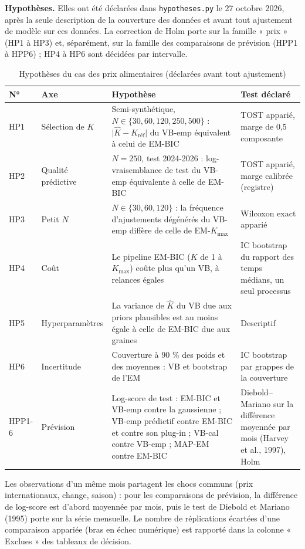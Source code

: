 \textbf{Hypothèses. }Elles ont été déclarées dans \texttt{hypotheses.py} le 27 octobre 2026, après la seule description de la couverture des données et avant tout ajustement de modèle sur ces données. La correction de Holm porte sur la famille « prix » (HP1 à HP3) et, séparément, sur la famille des comparaisons de prévision (HPP1 à HPP6) ; HP4 à HP6 sont décidées par intervalle.

\begin{table}[H]
\centering
\small
\setlength{\tabcolsep}{0.1cm}
\begin{tabular}{|p{1.3cm}|p{2.4cm}|p{5.6cm}|p{5.2cm}|}
\hline
\textbf{N°} & \textbf{Axe} & \textbf{Hypothèse} & \textbf{Test déclaré} \\
\hline
HP1 & Sélection de $K$ & Semi-synthétique, $N \in \{30, 60, 120, 250, 500\}$ : $\lvert\hat K - K_{\text{réf}}\rvert$ du VB-emp équivalent à celui de EM-BIC & TOST apparié, marge de 0,5 composante \\
\hline
HP2 & Qualité prédictive & $N = 250$, test 2024-2026 : log-vraisemblance de test du VB-emp équivalente à celle de EM-BIC & TOST apparié, marge calibrée (registre) \\
\hline
HP3 & Petit $N$ & $N \in \{30, 60, 120\}$ : la fréquence d'ajustements dégénérés du VB-emp diffère de celle de EM-$K_{\max}$ & Wilcoxon exact apparié \\
\hline
HP4 & Coût & Le pipeline EM-BIC ($K$ de 1 à $K_{\max}$) coûte plus qu'un VB, à relances égales & IC bootstrap du rapport des temps médians, un seul processus \\
\hline
HP5 & Hyperparamètres & La variance de $\hat K$ du VB due aux priors plausibles est au moins égale à celle de EM-BIC due aux graines & Descriptif \\
\hline
HP6 & Incertitude & Couverture à 90 \% des poids et des moyennes : VB et bootstrap de l'EM & IC bootstrap par grappes de la couverture \\
\hline
HPP1-6 & Prévision & Log-score de test : EM-BIC et VB-emp contre la gaussienne ; VB-emp prédictif contre EM-BIC et contre son plug-in ; VB-cal contre VB-emp ; MAP-EM contre EM-BIC & Diebold--Mariano sur la différence moyennée par mois (Harvey et al., 1997), Holm \\
\hline
\end{tabular}
\caption{Hypothèses du cas des prix alimentaires (déclarées avant tout ajustement)}
\label{tab:prix_hypotheses}
\end{table}

Les observations d'un même mois partagent les chocs communs (prix internationaux, change, saison) : pour les comparaisons de prévision, la différence de log-score est d'abord moyennée par mois, puis le test de Diebold et Mariano (1995) porte sur la série mensuelle. Le nombre de réplications écartées d'une comparaison appariée (bras en échec numérique) est rapporté dans la colonne « Exclues » des tableaux de décision.

